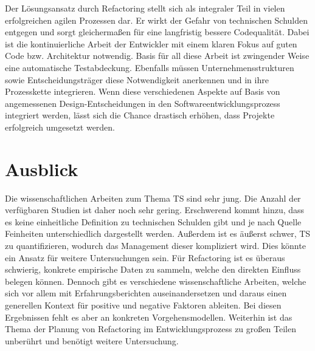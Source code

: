 \documentclass[acmtog]{acmart}
\begin{document}
Der Lösungsansatz durch Refactoring stellt sich als integraler Teil in vielen erfolgreichen
agilen Prozessen dar. Er wirkt der Gefahr von technischen Schulden entgegen und sorgt gleichermaßen
für eine langfristig bessere Codequalität. Dabei ist die kontinuierliche Arbeit der Entwickler
mit einem klaren Fokus auf guten Code bzw. Architektur notwendig. Basis für all diese Arbeit
ist zwingender Weise eine automatische Testabdeckung. Ebenfalls müssen Unternehmensstrukturen
sowie Entscheidungsträger diese Notwendigkeit anerkennen und in ihre Prozesskette integrieren.
Wenn diese verschiedenen Aspekte auf Basis von angemessenen Design-Entscheidungen in den
Softwareentwicklungsprozess integriert werden, lässt sich die Chance drastisch erhöhen,
dass Projekte erfolgreich umgesetzt werden.

\section{Ausblick}\label{sec:Ausblick}

Die wissenschaftlichen Arbeiten zum Thema TS sind sehr jung. Die Anzahl der verfügbaren
Studien ist daher noch sehr gering. Erschwerend kommt hinzu, dass es keine einheitliche
Definition zu technischen Schulden gibt und je nach Quelle Feinheiten unterschiedlich
dargestellt werden. Außerdem ist es äußerst schwer, TS zu quantifizieren, wodurch das
Management dieser kompliziert wird. Dies könnte ein Ansatz für weitere Untersuchungen sein.
Für Refactoring ist es überaus schwierig, konkrete empirische Daten zu sammeln, welche den
direkten Einfluss belegen können. Dennoch gibt es verschiedene wissenschaftliche Arbeiten,
welche sich vor allem mit Erfahrungsberichten auseinandersetzen und daraus einen generellen
Kontext für positive und negative Faktoren ableiten. Bei diesen Ergebnissen fehlt es aber
an konkreten Vorgehensmodellen. Weiterhin ist das Thema der Planung von Refactoring im
Entwicklungsprozess zu großen Teilen unberührt und benötigt weitere Untersuchung.



\end{document}
